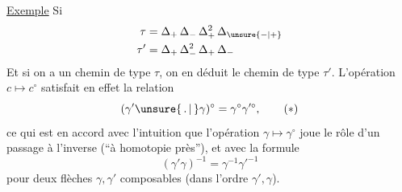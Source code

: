 \uline{Exemple} Si
\[\begin{aligned}\tau&=\Delta_+\,\Delta_-\,\Delta_+^2\,\Delta_{\unsure{-|+}}\\
\tau'&=\Delta_+\,\Delta_-^2\,\Delta_+\,\Delta_-\end{aligned}\]
Et si on a un chemin
de type $\tau$, on en déduit  le chemin
de type $\tau'$. L'opération $c\longmapsto c^\circ$ satisfait en
effet
la relation
\[(\gamma'\unsure{\,.\,|\,}\gamma)^\circ=\gamma^\circ\gamma'^\circ,\tag*{$(*)$}\]
ce qui est en accord avec l'intuition que l'opération $\gamma\longmapsto\gamma^\circ$ joue le rôle d'un passage à l'inverse (``à homotopie près''), et avec la formule
\[(\gamma'\gamma)^{-1}=\gamma^{-1}\gamma'^{-1}\]
pour deux flèches  $\gamma,\gamma'$ composables (dans l'ordre $\gamma',\gamma$).

